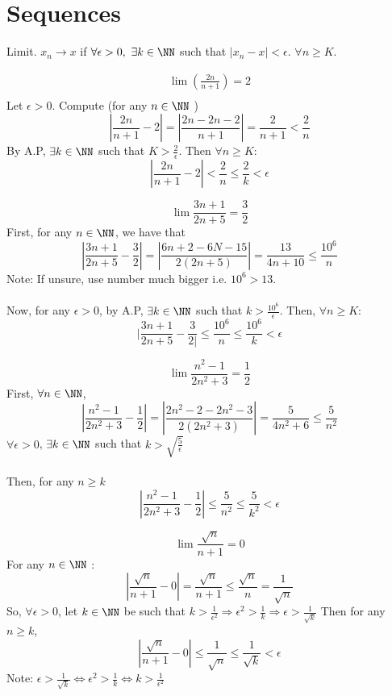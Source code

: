 \documentclass[class=scrartcl, crop=false]{standalone}
\date{10-23}
\begin{document}
\section{Sequences}

\begin{definition}
  Limit. $x_n \to x$ if $\forall \epsilon > 0,\ \exists k \in \NN$ such that $|x_n - x| < \epsilon$. $\forall n \geq K$.
\end{definition}

\begin{example}
  \begin{gather*}
    \lim(\frac{2n}{n + 1}) = 2 \\
  \end{gather*}
  Let $\epsilon > 0$. Compute (for any $n \in \NN$ )
  \[
    |\frac{2n}{n + 1} - 2| = |\frac{2n - 2n - 2}{n + 1}| = \frac{2}{n + 1} < \frac{2}{n}
  \]
  By A.P, $\exists k \in \NN$ such that $K > \frac{2}{\epsilon}$. Then $\forall n \geq K$:
  \[
    |\frac{2n}{n + 1} - 2| < \frac{2}{n} \leq \frac{2}{k} < \epsilon
  \]
\end{example}
\begin{example}
  \[
    \lim\frac{3n + 1}{2n + 5} = \frac{3}{2}
  \]
  First, for any $n \in \NN$, we have that 
  \[
    |\frac{3n + 1}{2n + 5} - \frac{3}{2}| = |\frac{6n + 2 - 6N - 15}{2(2n + 5)}| = \frac{13}{4n + 10} \leq \frac{10^6}{n}
  \]
  Note: If unsure, use number much bigger i.e. $10^6 > 13$. 
  \\\\
  Now, for any $\epsilon > 0$, by A.P, $\exists k \in \NN$ such that $k > \frac{10^6}{\epsilon}$. Then, $\forall n \geq K$:
  \[
    |\frac{3n + 1}{2n + 5} - \frac{3}{2|} \leq \frac{10^6}{n} \leq \frac{10^6}{k} < \epsilon
  \]
\end{example}
\begin{example}
  \[
    \lim\frac{n^2 - 1}{2n^2 + 3} = \frac{1}{2}
  \]
  First, $\forall n \in \NN$,
  \[
    |\frac{n^2 - 1}{2n^2 + 3} - \frac{1}{2}| = |\frac{2n^2 - 2 - 2n^2 - 3}{2(2n^2 + 3)}| = \frac{5}{4n^2 + 6} \leq \frac{5}{n^2}
  \]
  $\forall \epsilon > 0$, $\exists k \in \NN$ such that $k > \sqrt{\frac{5}{\epsilon}}$
  \\\\
  Then, for any $n \geq k$ 
  \[
    |\frac{n^2 - 1}{2n^2 + 3} - \frac{1}{2}| \leq \frac{5}{n^2} \leq \frac{5}{k^2} < \epsilon
  \]
\end{example}
\begin{example}
  \[
    \lim\frac{\sqrt{n}}{n + 1} = 0
  \]
  For any $n \in \NN$ :
  \[
    |\frac{\sqrt{n}}{n + 1} - 0| = \frac{\sqrt{n}}{n + 1} \leq \frac{\sqrt{n}}{n} = \frac{1}{\sqrt{n}}
  \]
  So, $\forall \epsilon > 0$, let $k \in \NN$ be such that $k > \frac{1}{\epsilon^2} \Rightarrow \epsilon^2 > \frac{1}{k} \Rightarrow \epsilon > \frac{1}{\sqrt{k}}$
  Then for any $n \geq k$,
  \[
    |\frac{\sqrt{n}}{n + 1} - 0| \leq \frac{1}{\sqrt{n}}\leq \frac{1}{\sqrt{k}} < \epsilon
  \]
  Note: $\epsilon > \frac{1}{\sqrt{k}}\Leftrightarrow \epsilon^2 > \frac{1}{k} \Leftrightarrow k > \frac{1}{\epsilon^2}$
\end{example}
\end{document}
